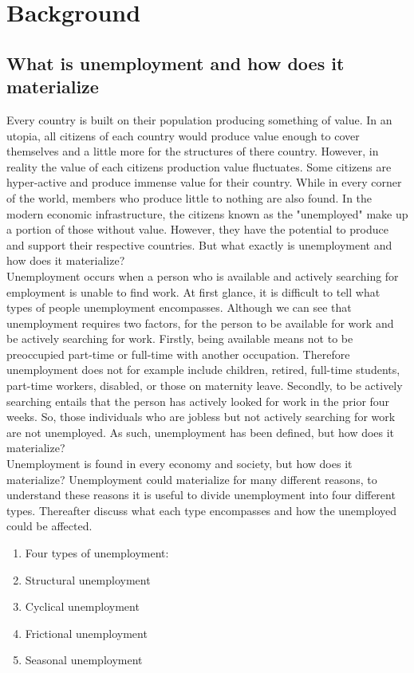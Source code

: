 \section{Background}\label{ch:background}

\subsection{What is unemployment and how does it materialize} \label{What is unemployment and how does it materialize}
Every country is built on their population producing something of value. 
In an utopia, all citizens of each country would produce value enough to cover themselves and a little more for the structures of there country.
However, in reality the value of each citizens production value fluctuates. 
Some citizens are hyper-active and produce immense value for their country.
While in every corner of the world, members who produce little to nothing are also found. 
In the modern economic infrastructure, the citizens known as the "unemployed" make up a portion of those without value.
However, they have the potential to produce and support their respective countries.
But what exactly is unemployment and how does it materialize? \\

Unemployment occurs when a person who is available and actively searching for employment is unable to find work. \cite{Guide_to_unemployment} 
At first glance, it is difficult to tell what types of people unemployment encompasses.
Although we can see that unemployment requires two factors, for the person to be available for work and be actively searching for work.
Firstly, being available means not to be preoccupied part-time or full-time with another occupation.
Therefore unemployment does not for example include children, retired, full-time students, part-time workers, disabled, or those on maternity leave.
Secondly, to be actively searching entails that the person has actively looked for work in the prior four weeks. \cite{US_unemployment_statistics_definition} 
So, those individuals who are jobless but not actively searching for work are not unemployed.
As such, unemployment has been defined, but how does it materialize? \\

Unemployment is found in every economy and society, but how does it materialize?
Unemployment could materialize for many different reasons, to understand these reasons it is useful to divide unemployment into four different types.
Thereafter discuss what each type encompasses and how the unemployed could be affected.
\begin{enumerate}
   \item Four types of unemployment:
   \item  Structural unemployment
   \item  Cyclical unemployment
   \item  Frictional unemployment
   \item  Seasonal unemployment\cite{Four_types_of_unemployment}
\end{enumerate}

